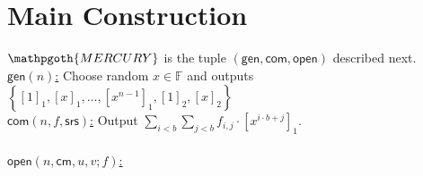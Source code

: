 \documentclass[11pt]{article} %
\newcommand{\mercury}{\ensuremath{\mathpgoth{MERCURY} }\xspace}
\newcommand{\F}{\ensuremath{\mathbb F}\xspace}
\newcommand{\srs}{\ensuremath{\mathsf{srs}}\xspace}
\newcommand{\com}{\ensuremath{\mathsf{com}}\xspace}
\newcommand{\cm}{\ensuremath{\mathsf{cm}}\xspace}
\newcommand{\open}{\ensuremath{\mathsf{open}}\xspace}
\newcommand{\enc}[1]{\ensuremath{\left[#1\right]_1}\xspace}
\newcommand{\enctwo}[1]{\ensuremath{\left[#1\right]_2}\xspace}
\newcommand{\gen}{\ensuremath{\mathsf{gen}}\xspace}
\newcommand{\set}[1]{\ensuremath{\left\{#1\right\}}\xspace}
\newcommand{\sumi}[1]{\sum_{i< #1}}
\newcommand{\sumj}[1]{\sum_{j< #1}}
\begin{document}
\section{Main Construction}\label{sec:main}
\mercury is the tuple $(\gen,\com,\open)$ described next. \\    

\noindent
\underline{$\gen(n)$:}
Choose random $x\in \F$ and outputs \set{\enc{1},\enc{x},\ldots,\enc{x^{n-1}},\enctwo{1},\enctwo{x}}\\

\noindent
\underline{$\com(n,f,\srs)$:}
 Output $\sumi{b}\sumj{b}f_{i,j}\cdot \enc{x^{i\cdot b + j}}$.\\ \\ 

\noindent
\underline{$\open(n,\cm,u,v;f)$:} \\ \noindent
\end{document}
